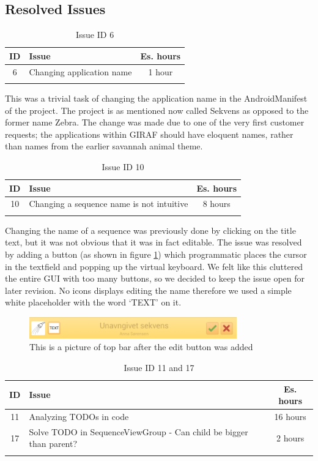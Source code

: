 \subsection{Resolved Issues} \label{subsec:spr1_resolved_issues}

\begin{longtable} { | c | p{12cm} | c | } 
\hline
	ID 	&	Issue	&		 Es. hours \\\hline
	6	& 	Changing application name	&	1 hour	\\\hline
\caption{Issue ID 6}
\label{tab:spr1_issue6}
\end{longtable}
This was a trivial task of changing the application name in the AndroidManifest of the project. The project is as mentioned now called Sekvens as opposed to the former name Zebra. The change was made due to one of the very first customer requests; the applications within GIRAF should have eloquent names, rather than names from the earlier savannah animal theme.

\begin{longtable} { | c | p{12cm} | c | } 
\hline
	ID 	&	Issue	&		 Es. hours \\\hline
	10	& 	Changing a sequence name is not intuitive	&	8 hours	\\\hline
\caption{Issue ID 10}
\label{tab:spr1_issue10}
\end{longtable}
Changing the name of a sequence was previously done by clicking on the title text, but it was not obvious that it was in fact editable.  The issue was resolved by adding a button (as shown in figure \ref{fig:Old_editName}) which programmatic places the cursor in the textfield and popping up the virtual keyboard. We felt like this cluttered the entire GUI with too many buttons, so we decided to keep the issue open for later revision. No icons displays editing the name therefore we used a simple white placeholder with the word `TEXT' on it. 
\begin{figure} [h!]
\centering
\includegraphics[width=0.8\textwidth]{Pics/Sprint1/editName/editNameButton.png}
\caption{This is a picture of top bar after the edit button was added}
\label{fig:Old_editName}
\end{figure}

\begin{longtable} { | c | p{12cm} | c | } 
\hline
	ID 	&	Issue	&		 Es. hours \\\hline
	11	& 	Analyzing TODOs in code	&	16 hours	\\\hline
	17	& 	Solve TODO in SequenceViewGroup - Can child be bigger than parent?	&	2 hours	\\\hline
\caption{Issue ID 11 and 17}
\label{tab:spr1_issues11_17}
\end{longtable}

